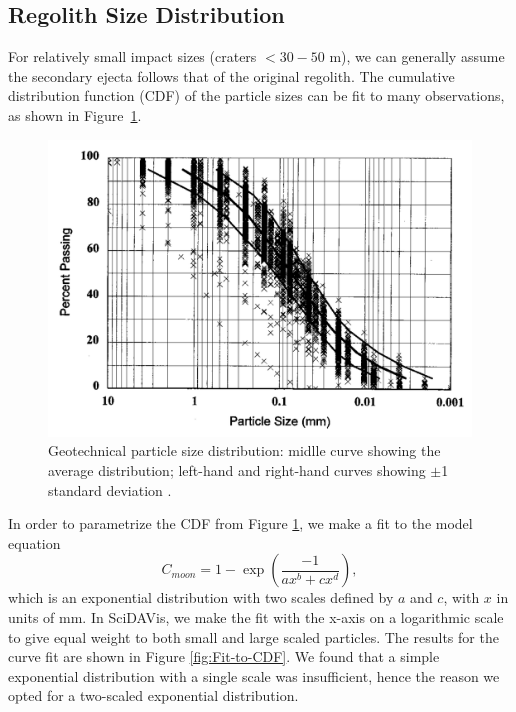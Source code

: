 \documentclass{hitec}
\begin{document}
\subsection{Regolith Size Distribution}
For relatively small impact sizes (craters $<30-50$ m), we can generally assume the secondary ejecta follows that of the original regolith. The cumulative distribution function (CDF) of the particle sizes can be fit to many observations, as shown in Figure~\ref{fig:Carrier2003_Fig1_particle-size-distribution}.

\begin{figure}[h!]
	\centering
	\includegraphics[scale=0.4]{Carrier2003_Fig1_particle-size-distribution.PNG}
	\caption{Geotechnical particle size distribution: midlle curve showing the average distribution; left-hand and right-hand curves showing $\pm$1 standard deviation \citep{carrier2003particle}.}\label{fig:Carrier2003_Fig1_particle-size-distribution}
\end{figure}

In order to parametrize the CDF from Figure \ref{fig:Carrier2003_Fig1_particle-size-distribution}, we make a fit to the model equation
\begin{equation}\label{eq:particle-CDF}
C_{moon} = 1 - \exp\left(\frac{-1}{ax^b+cx^d}\right),
\end{equation}
which is an exponential distribution with two scales defined by $a$ and $c$, with $x$ in units of mm. In \textsf{SciDAVis}, we make the fit with the x-axis on a logarithmic scale to give equal weight to both small and large scaled particles. The results for the curve fit are shown in Figure \ref{fig:Fit-to-CDF}. We found that a simple exponential distribution with a single scale was insufficient, hence the reason we opted for a two-scaled exponential distribution.
\end{document}
